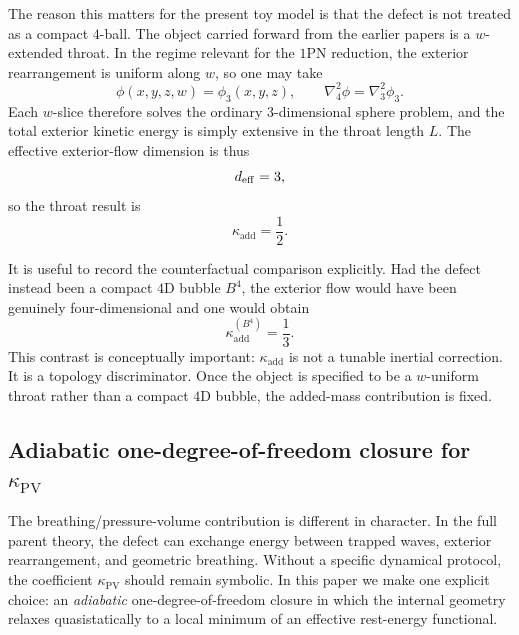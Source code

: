\documentclass[11pt]{article}
\newcommand{\kadd}{\kappa_{\mathrm{add}}}
\newcommand{\kPV}{\kappa_{\mathrm{PV}}}
\begin{document}
The reason this matters for the present toy model is that the defect is not treated as a
compact \(4\)-ball. The object carried forward from the earlier papers is a
\(w\)-extended throat. In the regime relevant for the \(1\)PN reduction, the exterior
rearrangement is uniform along \(w\), so one may take
\begin{equation}
\phi(x,y,z,w)=\phi_3(x,y,z),
\qquad
\nabla_4^2 \phi = \nabla_3^2 \phi_3.
\label{eq:throat-potential-factorization}
\end{equation}
Each \(w\)-slice therefore solves the ordinary \(3\)-dimensional sphere problem, and the
total exterior kinetic energy is simply extensive in the throat length \(L\). The
effective exterior-flow dimension is thus
\begin{equation}
d_{\rm eff}=3,
\end{equation}
so the throat result is
\begin{equation}
\boxed{\kadd=\frac12.}
\label{eq:kadd-half}
\end{equation}

It is useful to record the counterfactual comparison explicitly. Had the defect instead
been a compact \(4\)D bubble \(B^4\), the exterior flow would have been genuinely
four-dimensional and one would obtain
\begin{equation}
\kadd^{(B^4)}=\frac13.
\label{eq:kadd-bubble}
\end{equation}
This contrast is conceptually important: \(\kadd\) is not a tunable inertial correction.
It is a topology discriminator. Once the object is specified to be a \(w\)-uniform
throat rather than a compact \(4\)D bubble, the added-mass contribution is fixed.

\subsection{Adiabatic one-degree-of-freedom closure for \texorpdfstring{$\kPV$}{kappaPV}}
\label{sec:kappaPV-closure}

The breathing/pressure-volume contribution is different in character. In the full parent
theory, the defect can exchange energy between trapped waves, exterior rearrangement, and
geometric breathing. Without a specific dynamical protocol, the coefficient \(\kPV\)
should remain symbolic. In this paper we make one explicit choice: an \emph{adiabatic}
one-degree-of-freedom closure in which the internal geometry relaxes quasistatically to a
local minimum of an effective rest-energy functional.
\end{document}
